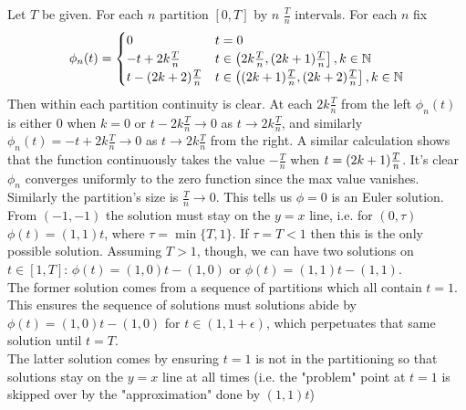 \documentclass{article}
\newenvironment{ex}[1]
  {\renewcommand\theexercise{#1}\exercise}
  {\endexercise}
\begin{document}
\begin{ex}{5.12} %
  Let $T$ be given. For each $n$ partition $[0, T]$ by $n$ $\frac{T}{n}$ intervals. For each $n$ fix
  $$
  \phi_n(t) = \begin{cases}
    0 & t = 0 \\
    -t + 2k\frac{T}{n} & t \in \left( 2k\frac{T}{n}, (2k+1)\frac{T}{n} \right], k \in \mathbb{N} \\
    t - (2k+2)\frac{T}{n} & t \in \left( (2k+1)\frac{T}{n}, (2k+2)\frac{T}{n} \right], k \in \mathbb{N} \\
  \end{cases}
  $$
  Then within each partition continuity is clear. At each $2k\frac{T}{n}$ from the left $\phi_n(t)$ is either $0$ when $k=0$ or $t - 2k\frac{T}{n} \to 0$ as $t \to 2k\frac{T}{n}$, and similarly $\phi_n(t) = -t + 2k\frac{T}{n} \to 0$ as $t \to 2k\frac{T}{n}$ from the right. A similar calculation shows that the function continuously takes the value $-\frac{T}{n}$ when $t = (2k+1)\frac{T}{n}$. It's clear $\phi_n$ converges uniformly to the zero function since the max value vanishes. Similarly the partition's size is $\frac{T}{n} \to 0$. This tells us $\phi = 0$ is an Euler solution.
\end{ex} %
\begin{ex}{5.13} %
  From $(-1,-1)$ the solution must stay on the $y=x$ line, i.e. for $(0, \tau)$ $\phi(t) = (1, 1)t$, where $\tau = \min\{T, 1\}$. If $\tau = T < 1$ then this is the only possible solution. Assuming $T > 1$, though, we can have two solutions on $t \in [1, T]$: $\phi(t) = (1, 0)t - (1, 0)$ or $\phi(t) = (1, 1)t - (1, 1)$. \, \\

  The former solution comes from a sequence of partitions which all contain $t=1$. This ensures the sequence of solutions must solutions abide by $\phi(t) = (1, 0)t - (1, 0)$ for $t \in (1, 1+\epsilon)$, which perpetuates that same solution until $t = T$. \, \\

  The latter solution comes by ensuring $t = 1$ is not in the partitioning so that solutions stay on the $y=x$ line at all times (i.e. the "problem" point at $t = 1$ is skipped over by the "approximation" done by $(1, 1)t$)
\end{ex} %
\end{document}

